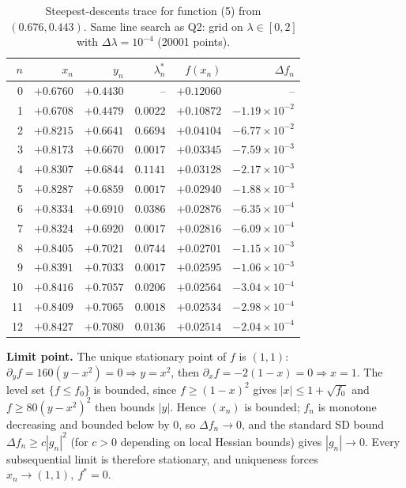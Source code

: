 \documentclass[11pt,a4paper]{article}
\begin{document}
\begin{table}[htbp]
\centering
\caption{Steepest-descents trace for function (5) from $(0.676,0.443)$. Same line search as Q2: grid on $\lambda\in[0,2]$ with $\Delta\lambda=10^{-4}$ (20001 points).}
\label{tab:q3-trace}
\begin{tabular}{rrrrrr}
\toprule
$n$ & $x_n$ & $y_n$ & $\lambda_n^\ast$ & $f(x_n)$ & $\Delta f_n$\\
\midrule
0  & $+0.6760$ & $+0.4430$ & --       & $+0.12060$ & --\\
1  & $+0.6708$ & $+0.4479$ & $0.0022$ & $+0.10872$ & $-1.19\times 10^{-2}$\\
2  & $+0.8215$ & $+0.6641$ & $0.6694$ & $+0.04104$ & $-6.77\times 10^{-2}$\\
3  & $+0.8173$ & $+0.6670$ & $0.0017$ & $+0.03345$ & $-7.59\times 10^{-3}$\\
4  & $+0.8307$ & $+0.6844$ & $0.1141$ & $+0.03128$ & $-2.17\times 10^{-3}$\\
5  & $+0.8287$ & $+0.6859$ & $0.0017$ & $+0.02940$ & $-1.88\times 10^{-3}$\\
6  & $+0.8334$ & $+0.6910$ & $0.0386$ & $+0.02876$ & $-6.35\times 10^{-4}$\\
7  & $+0.8324$ & $+0.6920$ & $0.0017$ & $+0.02816$ & $-6.09\times 10^{-4}$\\
8  & $+0.8405$ & $+0.7021$ & $0.0744$ & $+0.02701$ & $-1.15\times 10^{-3}$\\
9  & $+0.8391$ & $+0.7033$ & $0.0017$ & $+0.02595$ & $-1.06\times 10^{-3}$\\
10 & $+0.8416$ & $+0.7057$ & $0.0206$ & $+0.02564$ & $-3.04\times 10^{-4}$\\
11 & $+0.8409$ & $+0.7065$ & $0.0018$ & $+0.02534$ & $-2.98\times 10^{-4}$\\
12 & $+0.8427$ & $+0.7080$ & $0.0136$ & $+0.02514$ & $-2.04\times 10^{-4}$\\
\bottomrule
\end{tabular}
\end{table}

\textbf{Limit point.}
The unique stationary point of $f$ is $(1,1)$: $\partial_y f = 160(y-x^{2})=0\Rightarrow y=x^{2}$, then $\partial_x f = -2(1-x)=0\Rightarrow x=1$. The level set $\{f\le f_0\}$ is bounded, since $f\ge(1-x)^{2}$ gives $|x|\le 1+\sqrt{f_0}$ and $f\ge 80(y-x^{2})^{2}$ then bounds $|y|$. Hence $(x_n)$ is bounded; $f_n$ is monotone decreasing and bounded below by $0$, so $\Delta f_n\to 0$, and the standard SD bound $\Delta f_n\ge c|g_n|^{2}$ (for $c>0$ depending on local Hessian bounds) gives $|g_n|\to 0$. Every subsequential limit is therefore stationary, and uniqueness forces $x_n\to(1,1),\ f^{\ast}=0$.
\end{document}

